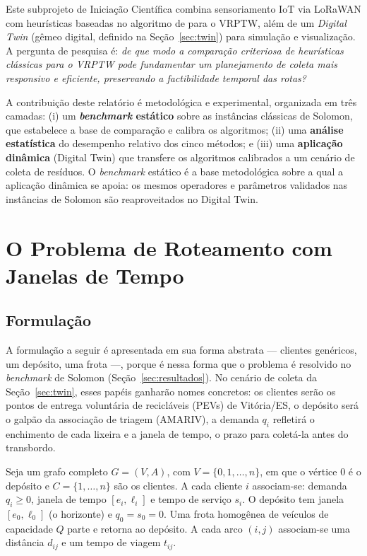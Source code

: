 \documentclass[12pt, a4paper]{article}
\begin{document}
Este subprojeto de Iniciação Científica combina sensoriamento IoT via LoRaWAN \citep{ramson2021lorawan,de2021plataforma} com heurísticas baseadas no algoritmo de \citet{solomon1987algorithms} para o VRPTW, além de um \textit{Digital Twin} (gêmeo digital, definido na Seção~\ref{sec:twin}) para simulação e visualização. A pergunta de pesquisa é: \emph{de que modo a comparação criteriosa de heurísticas clássicas para o VRPTW pode fundamentar um planejamento de coleta mais responsivo e eficiente, preservando a factibilidade temporal das rotas?}

A contribuição deste relatório é metodológica e experimental, organizada em três camadas: (i) um \textbf{\textit{benchmark} estático} sobre as instâncias clássicas de Solomon, que estabelece a base de comparação e calibra os algoritmos; (ii) uma \textbf{análise estatística} do desempenho relativo dos cinco métodos; e (iii) uma \textbf{aplicação dinâmica} (Digital Twin) que transfere os algoritmos calibrados a um cenário de coleta de resíduos. O \textit{benchmark} estático é a base metodológica sobre a qual a aplicação dinâmica se apoia: os mesmos operadores e parâmetros validados nas instâncias de Solomon são reaproveitados no Digital Twin.

\section{O Problema de Roteamento com Janelas de Tempo}\label{sec:problema}

\subsection{Formulação}
A formulação a seguir é apresentada em sua forma abstrata --- clientes genéricos, um depósito, uma frota ---, porque é nessa forma que o problema é resolvido no \textit{benchmark} de Solomon (Seção~\ref{sec:resultados}). No cenário de coleta da Seção~\ref{sec:twin}, esses papéis ganharão nomes concretos: os clientes serão os pontos de entrega voluntária de recicláveis (PEVs) de Vitória/ES, o depósito será o galpão da associação de triagem (AMARIV), a demanda $q_i$ refletirá o enchimento de cada lixeira e a janela de tempo, o prazo para coletá-la antes do transbordo.

Seja um grafo completo $G=(V,A)$, com $V=\{0,1,\dots,n\}$, em que o vértice $0$ é o depósito e $C=\{1,\dots,n\}$ são os clientes. A cada cliente $i$ associam-se: demanda $q_i\ge 0$, janela de tempo $[e_i,\ell_i]$ e tempo de serviço $s_i$. O depósito tem janela $[e_0,\ell_0]$ (o horizonte) e $q_0=s_0=0$. Uma frota homogênea de veículos de capacidade $Q$ parte e retorna ao depósito. A cada arco $(i,j)$ associam-se uma distância $d_{ij}$ e um tempo de viagem $t_{ij}$.
\end{document}
